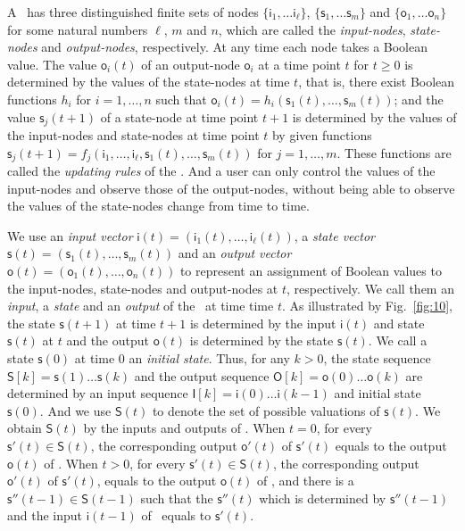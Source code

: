A \BCN\ has three distinguished finite sets of nodes $\{\mathsf{i}_1,\ldots\mathsf{i}_\ell\}$, $\{\mathsf{s}_1,\ldots\mathsf{s}_m\}$ and $\{\mathsf{o}_1,\ldots\mathsf{o}_n\}$ for some natural numbers $\ell$, $m$ and $n$, which are called the {\em input-nodes}, {\em state-nodes}  and {\em output-nodes}, respectively. At any time each node takes a Boolean value. The value $\mathsf{o}_i(t)$ of an output-node $\mathsf{o}_i$ at a time point $t$ for $t\ge0$ is determined by the values of the state-nodes at time $t$, that is, there exist Boolean functions $h_i$ for $i=1,\ldots,n$ such that $\mathsf{o}_i(t)=h_i(\mathsf{s}_1(t),\ldots,\mathsf{s}_m(t))$; and the value $\mathsf{s}_j(t+1)$ of a state-node at time point $t+1$ is determined by the values of the input-nodes and state-nodes at time point $t$ by given functions $\mathsf{s}_j(t+1)=f_j(\mathsf{i}_1,\ldots,\mathsf{i}_\ell,\mathsf{s}_1(t),\ldots,\mathsf{s}_m(t))$ for $j=1,\ldots,m$. These functions are called the {\em updating rules} of the \BCN. And a user can only control the  values of the input-nodes and observe those of the output-nodes, without being able to observe the values of the state-nodes change from time to time. 

We use an {\em input vector} $\mathsf{i}(t)=(\mathsf{i}_1(t),\ldots,\mathsf{i}_\ell (t))$, a {\em state vector} $\mathsf{s}(t)=(\mathsf{s}_1(t), \ldots, \mathsf{s}_m(t))$ and an {\em output  vector} $\mathsf{o}(t)=(\mathsf{o}_1(t),\ldots, \mathsf{o}_n(t))$  to represent an assignment of Boolean values to the  input-nodes, state-nodes and  output-nodes at $t$, respectively.  We call them an {\em input}, a {\em state} and an {\em output} of the \BCN\ at time time $t$. As  illustrated by Fig.~\ref{fig:10},  the state $\mathsf{s}(t+1)$ at time $t+1$ is determined by the input $\mathsf{i}(t)$ and state $\mathsf{s}(t)$ at $t$  and the output $\mathsf{o}(t)$  is determined by the state  $\mathsf{s}(t)$.  We call a state $\mathsf{s}(0)$ at time $0$ an {\em initial state}. Thus, for any $k>0$, the state sequence  $\mathsf{S}[k]=\mathsf{s}(1)\ldots\mathsf{s}(k)$ and the output sequence $\mathsf{O}[k]=\mathsf{o}(0)\ldots\mathsf{o}(k)$ are  determined by an  input sequence $\mathsf{I}[k]=\mathsf{i}(0)\ldots\mathsf{i}(k-1)$ and initial state $\mathsf{s}(0)$. And we use $\mathsf{S}(t)$ to denote the set of possible valuations of $\mathsf{s}(t)$. We obtain $\mathsf{S}(t)$ by the inputs and outputs of \BCN. When $t=0$, for every $\mathsf{s}'(t)\in\mathsf{S}(t)$, the corresponding output $\mathsf{o}'(t)$ of $\mathsf{s}'(t)$ equals to the output $\mathsf{o}(t)$ of \BCN. When $t>0$, for every $\mathsf{s}'(t)\in\mathsf{S}(t)$, the corresponding output $\mathsf{o}'(t)$ of $\mathsf{s}'(t)$, equals to the output $\mathsf{o}(t)$ of \BCN, and there is a $\mathsf{s}''(t-1)\in\mathsf{S}(t-1)$ such that the $\mathsf{s}''(t)$ which is determined by $\mathsf{s}''(t-1)$ and the input $\mathsf{i}(t-1)$ of \BCN\ equals to $\mathsf{s}'(t)$.

